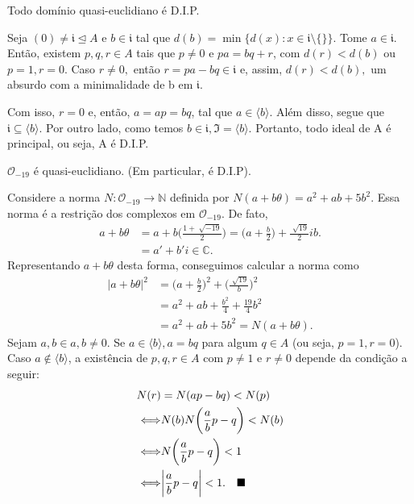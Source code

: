 \documentclass[algebraII_notes.tex]{subfiles}
\begin{document}
\begin{lemma*}
	Todo domínio quasi-euclidiano é D.I.P.
\end{lemma*}
\begin{proof*}
	Seja \((0)\neq \mathfrak{i}\trianglelefteq{A}\) e \(b\in \mathfrak{i}\) tal que \(d(b) = \min\{d(x):x\in \mathfrak{i}\setminus{\{\}}\}\).
	Tome \(a\in \mathfrak{i}.\) Então, existem \(p, q, r\in A\) tais que \(p\neq 0\) e \(pa = bq + r\), com \(d(r) < d(b)\) ou \(p=1, r=0.\)
	Caso \(r\neq 0,\) então \(r = pa-bq\in \mathfrak{i}\) e, assim, \(d(r) < d(b),\) um absurdo com a minimalidade de b em \(\mathfrak{i}.\)

	Com isso, \(r=0\) e, então, \(a = ap = bq\), tal que \(a\in \langle b \rangle.\) Além disso, segue que \(\mathfrak{i}\subseteq{\langle b \rangle}.\)
	Por outro lado, como temos \(b\in \mathfrak{i}, \mathfrak{I} = \langle b \rangle\). Portanto, todo ideal de A é principal, ou seja, A é D.I.P. \qedsymbol
\end{proof*}
\begin{theorem*}
	\(\mathcal{O}_{-19}\) é quasi-euclidiano. (Em particular, é D.I.P).
\end{theorem*}
\begin{proof*}
	Considere a norma \(N:\mathcal{O}_{-19}\rightarrow \mathbb{N}\) definida por \(N(a+b\theta ) = a^{2} + ab + 5b^{2}.\) Essa norma é a
	restrição dos complexos em \(\mathcal{O}_{-19}.\) De fato,
	\begin{align*}
		a + b\theta & = a +b \biggl(\frac{1+\sqrt[]{-19}}{2}\biggr) = \biggl(a + \frac{b}{2}\biggr) + \frac{\sqrt[]{19}}{2}ib. \\
		            & = a' + b'i\in \mathbb{C}.
	\end{align*}
	Representando \(a + b\theta \) desta forma, conseguimos calcular a norma como
	\begin{align*}
		|a+b\theta |^{2} & = \biggl(a + \frac{b}{2}\biggr)^{2} + \biggl(\frac{\sqrt[]{19}}{b}\biggr)^{2} \\
		                 & = a^{2} + ab + \frac{b^{2}}{4} + \frac{19}{4}b^{2}                            \\
		                 & = a^{2} + ab + 5b^{2} = N(a + b\theta ).
	\end{align*}
	Sejam \(a, b\in a, b\neq0.\) Se \(a\in \langle b \rangle, a = bq\) para algum \(q\in A\) (ou seja, \(p=1, r = 0\)).
	Caso \(a\not\in \langle b \rangle\), a existência de \(p, q, r\in A\) com \(p\neq 1\) e \(r\neq 0\) depende da condição
	a seguir:
	\begin{align*}
		N(r)                & = N(ap-bq) < N(p)                                          \\
		\Longleftrightarrow & N(b)N \biggl(\frac{a}{b}p - q\biggr) < N(b)                \\
		\Longleftrightarrow & N \biggl(\frac{a}{b}p - q\biggr) < 1                       \\
		\Longleftrightarrow & \biggl|\frac{a}{b}p - q\biggr| < 1. \quad\text{$\blacksquare$}
	\end{align*}
\end{proof*}
\end{document}
